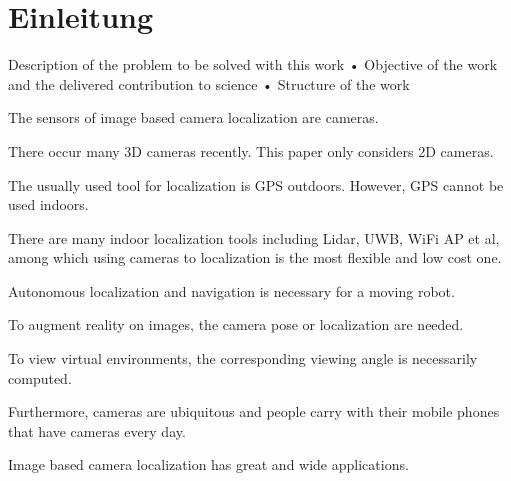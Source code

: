 
\section{Einleitung}

Description of the problem to be solved with this work
• Objective of the work and the delivered contribution to science
• Structure of the work


The sensors of image based camera localization are cameras. 


There occur many 3D cameras
recently. This paper only considers 2D cameras. 


The usually used tool for localization is GPS
outdoors. However, GPS cannot be used indoors. 

There are many indoor localization tools
including Lidar, UWB, WiFi AP et al, among which using cameras to localization is the most
flexible and low cost one. 

Autonomous localization and navigation is necessary for a moving
robot. 


To augment reality on images, the camera pose or localization are needed. 

To view virtual
environments, the corresponding viewing angle is necessarily computed. 


Furthermore, cameras
are ubiquitous and people carry with their mobile phones that have cameras every day. 

Image
based camera localization has great and wide applications.
\cite{wuImageBasedCamera2016}